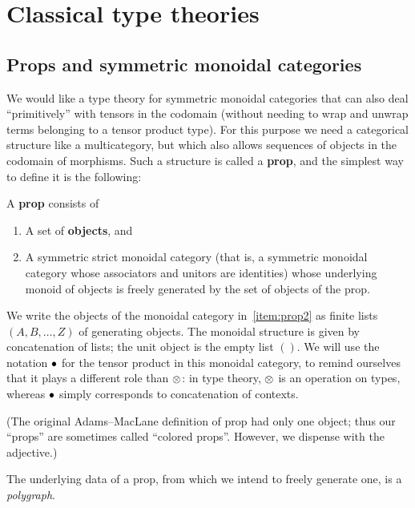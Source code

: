 \chapter{Classical type theories}
\label{chap:polycats}


\section{Props and symmetric monoidal categories}
\label{sec:prop-smc}

\begin{props}

We would like a type theory for symmetric monoidal categories that can also deal ``primitively'' with tensors in the codomain (without needing to wrap and unwrap terms belonging to a tensor product type).
For this purpose we need a categorical structure like a multicategory, but which also allows sequences of objects in the codomain of morphisms.
Such a structure is called a \textbf{prop}, and the simplest way to define it is the following:

\begin{defn}\label{defn:prop}
  A \textbf{prop} consists of
  \begin{enumerate}
  \item A set of \textbf{objects}, and
  \item A symmetric strict monoidal category (that is, a symmetric monoidal category whose associators and unitors are identities) whose underlying monoid of objects is freely generated by the set of objects of the prop.\label{item:prop2}
  \end{enumerate}
\end{defn}

We write the objects of the monoidal category in~\ref{item:prop2} as finite lists $(A,B,\dots,Z)$ of generating objects.
The monoidal structure is given by concatenation of lists; the unit object is the empty list $()$.
We will use the notation $\bullet$ for the tensor product in this monoidal category, to remind ourselves that it plays a different role than $\otimes$: in type theory, $\otimes$ is an operation on types, whereas $\bullet$ simply corresponds to concatenation of contexts.

(The original Adams--MacLane definition of prop had only one object; thus our ``props'' are sometimes called ``colored props''.
However, we dispense with the adjective.)

The underlying data of a prop, from which we intend to freely generate one, is a \emph{polygraph}.


\end{props}

